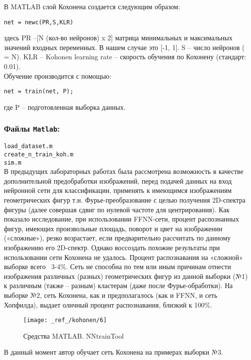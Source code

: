 \documentclass[12pt,a4paper]{article}
\begin{document}
В MATLAB слой Кохонена создается следующим образом:
\begin{verbatim}
net = newc(PR,S,KLR)
\end{verbatim}
здесь PR –[N (кол-во нейронов) x 2] матрица минимальных и максимальных значений входных переменных. В нашем случае это [-1, 1]. S – число нейронов ( = N). KLR – Kohonen learning rate – скорость обучения по Кохонену (стандарт: 0.01).\\


Обучение производится с помощью:
\begin{verbatim}
net = train(net, P);
\end{verbatim}
где P – подготовленная выборка данных.

\subsubsection*{Файлы \texttt{Matlab}:}
\verb|load_dataset.m|\\
\verb|create_n_train_koh.m|\\
\verb|sim.m|\\[6pt]


В предыдущих лабораторных работах была рассмотрена возможность в качестве дополнительной предобработки изображений, перед подачей данных на вход нейронной сети для классификации, применять к имеющимся изображениям геометрических фигур т.н. Фурье-преобразование с целью получения 2D-спектра фигуры (далее совершая сдвиг по нулевой частоте для центрирования). Как показало исследование, при использовании FFNN-сети, процент распознанных фигур, имеющих произвольные площадь, поворот и цвет на изображении («сложные»), резко возрастает, если предварительно рассчитать по данному изображению его 2D-спектр. Однако воссоздать похожие результаты при использовании сети Кохонена не удалось. Процент распознавания на «сложной» выборке всего ~3-4\%. 
Сеть не способна по тем или иным причинам отнести изображения различных (разных) геометрических фигур из данной выборки (№1) к различным (также – разным) кластерам (даже после Фурье-обработки).
На выборке №2, сеть Кохонена, как и предполагалось (как и FFNN, и сеть Хопфилда), выдает оличный процент распознавания, близкий к 100\%.

\begin{figure}[h!]
	\centering
	\texttt{[image: \_ref\_/kohonen/6]}
	\caption{Средства MATLAB. NNtrainTool\label{fig:06}}
\end{figure}

В данный момент автор обучает сеть Кохонена на примерах выборки №3.
\end{document}
